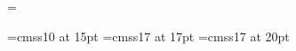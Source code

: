 
\newif\ifcorrectionmode

\correctionmodefalse

\musicparskip\parindent12mm
\bigaccid
\nopagenumbers %
\headline={\ifnum{}\else \ifodd\pageno\rightheadline \else\leftheadline\fi \fi}
\def\rightheadline{\tenrm\hfil\folio}
\def\leftheadline{\tenrm\folio\hfil}
\nostartrule
\def\writebarno{\llap{\tentt\the\barno\barnoadd}}%
\def\raisebarno{1.7\Interligne}%
\def\shiftbarno{3.0\internote}%
\def\writezbarno{}%

\font\sansseriffifteen=cmss10 at 15pt
\font\sansserifseventeen=cmss17 at 17pt
\font\sansseriftwenty=cmss17 at 20pt
\def\parttitle#1{
  \centerline{\BIGfont Neunte Symphonie}
  \hbox to \hsize{\boxit{\sansserifseventeen{#1}}\hfill\nobreak{\medtype Gustav Mahler}}%
}
\def\movement#1{
	\centerline{\sansseriftwenty #1}\smallskip
}

